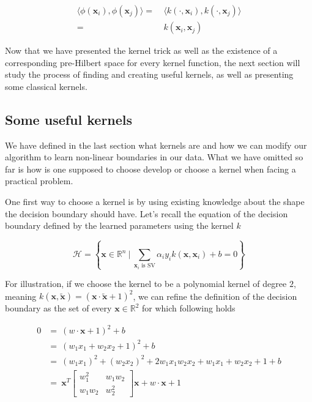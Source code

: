\begin{equation*}
  \begin{aligned}
    \langle \phi(\mathbf{x}_i), \phi(\mathbf{x}_j)\rangle =\ &\langle k\left(\cdot, \mathbf{x}_i\right), k\left(\cdot, \mathbf{x}_j\right)\rangle \\
    =\ &k(\mathbf{x}_i, \mathbf{x}_j)
  \end{aligned}
\end{equation*}

Now that we have presented the kernel trick as well as the existence of a corresponding pre-Hilbert space for every kernel function, the next section will study the process of finding and creating useful kernels, as well as presenting some classical kernels.

\subsection {Some useful kernels}

We have defined in the last section what kernels are and how we can modify our algorithm to learn non-linear boundaries in our data. What we have omitted so far is how is one supposed to choose develop or choose a kernel when facing a practical problem.

One first way to choose a kernel is by using existing knowledge about the shape the decision boundary should have. Let's recall the equation of the decision boundary defined by the learned parameters using the kernel $k$

\begin{equation*}
  \mathscr{H} = \left\{\mathbf{x} \in \mathbb{R}^n\ |\ \sum_{\mathbf{x}_i \text{ is SV}}\alpha_iy_ik\left(\mathbf{x}, \mathbf{x}_i\right) + b = 0\right\}
\end{equation*}

For illustration, if we choose the kernel to be a polynomial kernel of degree $2$, meaning $k\left(\mathbf{x}, \mathbf{\tilde{x}}\right) = \left(\mathbf{x} \cdot \mathbf{\tilde{x}} + 1\right)^2$, we can refine the definition of the decision boundary as the set of every $\mathbf{x} \in \mathbb{R}^2$ for which following holds

\begin{equation*}
  \begin{aligned}
    0 &=\ \left(w \cdot \mathbf{x} + 1\right)^2 + b\\
      &=\ \left(w_1x_1 + w_2x_2 + 1\right)^2 + b\\
      &=\ (w_1x_1)^2 + (w_2x_2)^2 + 2w_1x_1w_2x_2 + w_1x_1 + w_2x_2 + 1 + b\\
      &=\ \mathbf{x}^T\begin{bmatrix}w_1^2 & w_1w_2\\ w_1w_2 & w_2^2\end{bmatrix}\mathbf{x} + w \cdot \mathbf{x} + 1 
  \end{aligned}
\end{equation*}

